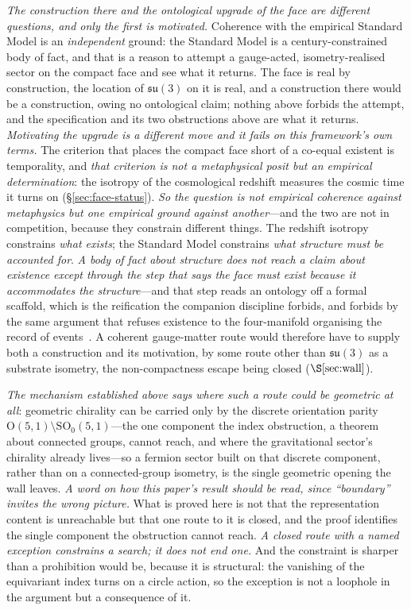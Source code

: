 \documentclass[11pt]{article}
\theoremstyle{plain}
\theoremstyle{remark}
\newcommand{\su}{\mathfrak{su}}
\begin{document}
\emph{The construction there and the ontological upgrade of the face are different questions, and only the first is motivated.} Coherence with the empirical Standard Model is an \emph{independent} ground: the Standard Model is a century-constrained body of fact, and that is a reason to attempt a gauge-acted, isometry-realised sector on the compact face and see what it returns. The face is real by construction, the location of $\su(3)$ on it is real, and a construction there would be a construction, owing no ontological claim; nothing above forbids the attempt, and the specification and its two obstructions above are what it returns. \emph{Motivating the upgrade is a different move and it fails on this framework's own terms.} The criterion that places the compact face short of a co-equal existent is temporality, and \emph{that criterion is not a metaphysical posit but an empirical determination}: the isotropy of the cosmological redshift measures the cosmic time it turns on (\S\ref{sec:face-status}). \emph{So the question is not empirical coherence against metaphysics but one empirical ground against another}---and the two are not in competition, because they constrain different things. The redshift isotropy constrains \emph{what exists}; the Standard Model constrains \emph{what structure must be accounted for}. \emph{A body of fact about structure does not reach a claim about existence except through the step that says the face must exist because it accommodates the structure}---and that step reads an ontology off a formal scaffold, which is the reification the companion discipline forbids, and forbids by the same argument that refuses existence to the four-manifold organising the record of events~\cite{JanzenShadowExistence}. A coherent gauge-matter route would therefore have to supply both a construction and its motivation, by some route other than $\su(3)$ as a substrate isometry, the non-compactness escape being closed ($\S\ref{sec:wall}$).

\emph{The mechanism established above says where such a route could be geometric at all}: geometric chirality can be carried only by the discrete orientation parity $\mathrm{O}(5,1)\setminus\mathrm{SO}_0(5,1)$---the one component the index obstruction, a theorem about connected groups, cannot reach, and where the gravitational sector's chirality already lives---so a fermion sector built on that discrete component, rather than on a connected-group isometry, is the single geometric opening the wall leaves. \emph{A word on how this paper's result should be read, since ``boundary'' invites the wrong picture.} What is proved here is not that the representation content is unreachable but that one route to it is closed, and the proof identifies the single component the obstruction cannot reach. \emph{A closed route with a named exception constrains a search; it does not end one.} And the constraint is sharper than a prohibition would be, because it is structural: the vanishing of the equivariant index turns on a circle action, so the exception is not a loophole in the argument but a consequence of it.
\end{document}
